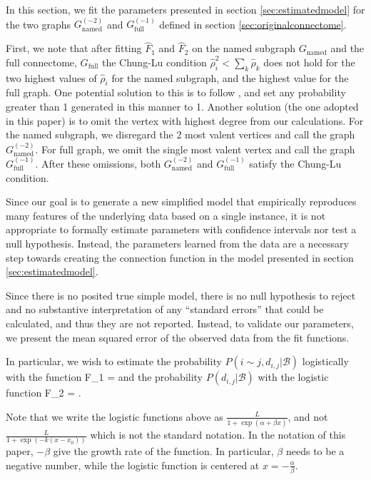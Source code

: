 \documentclass[11]{article}
\def\bas #1\eas{\begin{align*} #1 \end{align*}}
\newcommand{\varep}{\varepsilon}
\newcommand{\namedtwo}{G_{\textrm{named}}^{(-2)}}
\newcommand{\fullone}{G_{\textrm{full}}^{(-1)}}
\newcommand{\rB}{\mathcal{B}}
\theoremstyle{remark}
\theoremstyle{definition}
\begin{document}

 In this section, we fit the parameters presented in section \ref{sec:estimatedmodel} for the two graphs $\namedtwo$ and $\fullone$ defined in section \ref{sec:originalconnectome}. 
 
First, we note that after fitting $\hat F_1$ and $\hat F_2$ on the named subgraph $G_{\textrm{named}}$ and the full connectome, $G_{\textrm{full}}$ the Chung-Lu condition $\hat \rho_i^2 < \sum_k \hat \rho_k$ does not hold for the two highest values of $\hat \rho_i$ for the named subgraph, and the highest value for the full graph. One potential solution to this is to follow  \cite{bringmann2019geometric}, and set any probability greater than 1 generated in this manner to 1. Another solution (the one adopted in this paper) is to omit the vertex with highest degree from our calculations. For the named subgraph, we disregard the 2 most valent vertices and call the graph $\namedtwo$. For full graph, we omit the single most valent vertex and call the graph $\fullone$. After these omissions, both $\namedtwo$ and $\fullone$ satisfy the Chung-Lu condition. 

Since our goal is to generate a new simplified model that empirically reproduces many features of the underlying data based on a single instance, it is not appropriate to formally estimate parameters with confidence intervals nor test a null hypothesis. Instead, the parameters learned from the data are a necessary step towards creating the connection function in the model presented in section \ref{sec:estimatedmodel}.

Since there is no posited true simple model, there is no null hypothesis to reject and no substantive interpretation of any ``standard errors'' that could be calculated, and thus they are not reported. Instead, to validate our parameters, we present the mean squared error of the observed data from the fit functions. 

In particular, we wish to estimate the probability $P(i \sim j, d_{i,j} | \rB)$ logistically with the function \bas \hat F_1 =   \frac{\varep}{1 + \exp(\alpha_1  + \beta_1x)}\eas and the probability $P(d_{i,j} | \rB)$ with the logistic function \bas \hat F_2 = \;.\eas 

Note that we write the logistic functions above as $\frac{L}{1 + \exp(\alpha + \beta x)}$, and not $\frac{L}{1 + \exp(-k(x - x_0))}$ which is not the standard notation. In the notation of this paper, $-\beta$ give the growth rate of the function. In particular, $\beta$ needs to be a negative number, while the logistic function is centered at $x = -\frac{\alpha}{\beta}$.
\end{document}
